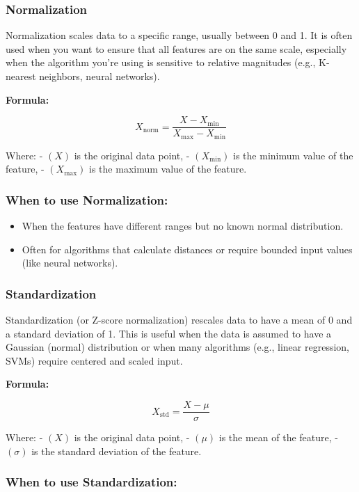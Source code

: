 \documentclass[12pt]{book}
\providecommand{\tightlist}{%
  \setlength{\itemsep}{0pt}\setlength{\parskip}{0pt}}
\begin{document}
\subsubsection{Normalization}\label{normalization}

Normalization scales data to a specific range, usually between 0 and 1.
It is often used when you want to ensure that all features are on the
same scale, especially when the algorithm you're using is sensitive to
relative magnitudes (e.g., K-nearest neighbors, neural networks).

\textbf{Formula:}

\[
X_{\text{norm}} = \frac{X - X_{\min}}{X_{\max} - X_{\min}}
\]

Where: - \((X)\) is the original data point, - \((X_{\min})\) is the
minimum value of the feature, - \((X_{\max})\) is the maximum value of
the feature.

\subsubsection{When to use
Normalization:}\label{when-to-use-normalization}

\begin{itemize}
\tightlist
\item
  When the features have different ranges but no known normal
  distribution.
\item
  Often for algorithms that calculate distances or require bounded input
  values (like neural networks).
\end{itemize}

\subsubsection{Standardization}\label{standardization}

Standardization (or Z-score normalization) rescales data to have a mean
of 0 and a standard deviation of 1. This is useful when the data is
assumed to have a Gaussian (normal) distribution or when many algorithms
(e.g., linear regression, SVMs) require centered and scaled input.

\textbf{Formula:}

\[
X_{\text{std}} = \frac{X - \mu}{\sigma}
\]

Where: - \((X)\) is the original data point, - \((\mu)\) is the mean of
the feature, - \((\sigma)\) is the standard deviation of the feature.

\subsubsection{When to use
Standardization:}\label{when-to-use-standardization}
\end{document}
